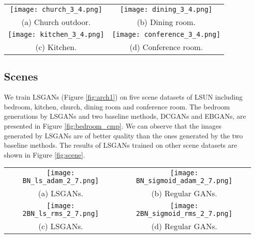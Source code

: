 \documentclass{article} %
\begin{document}
\begin{figure*}[t]
\centering
\begin{tabular}{cc}
 \texttt{[image: church\_3\_4.png]}
&
 \texttt{[image: dining\_3\_4.png]}
\\
(a) \small Church outdoor.
&
(b) \small Dining room.
\\
 \texttt{[image: kitchen\_3\_4.png]}
&
 \texttt{[image: conference\_3\_4.png]}
\\
(c) \small Kitchen.
&
(d) \small Conference room.
\end{tabular}
\caption{
Generated images on different scene datasets.
}
\label{fig:scene}
\end{figure*}

\subsection{Scenes}
We train LSGANs (Figure \ref{fig:arch1}) on five scene datasets of LSUN including bedroom, kitchen, church, dining room and conference room. The bedroom generations by LSGANs and two baseline methods, DCGANs and EBGANs, are presented in Figure \ref{fig:bedroom_cmp}. We can observe that the images generated by LSGANs are of better quality than the ones generated by the two baseline methods. The results of LSGANs trained on other scene datasets are shown in Figure \ref{fig:scene}. 

\begin{figure*}[t]
\centering
\begin{tabular}{cc}
 \texttt{[image: BN\_ls\_adam\_2\_7.png]}
&
 \texttt{[image: BN\_sigmoid\_adam\_2\_7.png]}
\\
(a) \small LSGANs.
&
(b) \small Regular GANs.
\\
 \texttt{[image: 2BN\_ls\_rms\_2\_7.png]}
&
 \texttt{[image: 2BN\_sigmoid\_rms\_2\_7.png]}
\\
(c) \small LSGANs.
&
(d) \small Regular GANs.
\end{tabular}
\caption{
Comparison experiments by excluding batch normalization (BN). (a): LSGANs without BN in $G$ using Adam. (b): Regular GANs without BN in $G$ using Adam. (c): LSGANs without BN in $G$ and $D$ using RMSProp. (d): Regular GANs without BN in $G$ and $D$ using RMSProp.
}
\label{fig:no_BN}
\end{figure*}
\end{document}
